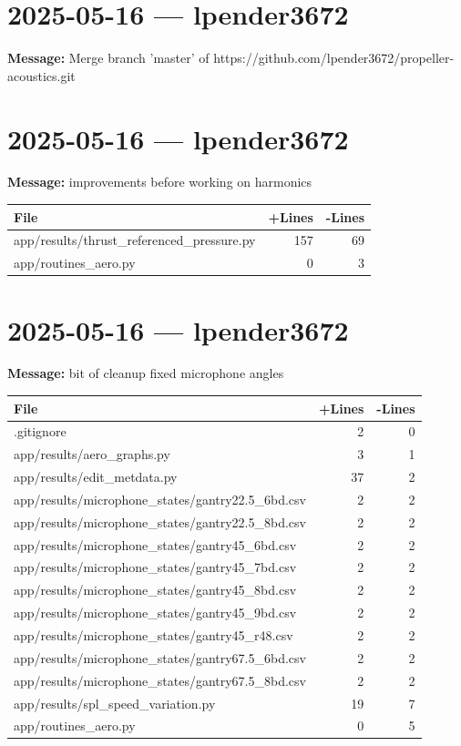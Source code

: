 \documentclass{article}
\begin{document}
\section*{2025-05-16 --- lpender3672}
\textbf{Message:} Merge branch 'master' of https://github.com/lpender3672/propeller-acoustics.git

\section*{2025-05-16 --- lpender3672}
\textbf{Message:} improvements before working on harmonics

\begin{longtable}{|p{10cm}|r|r|}
\hline \textbf{File} & \textbf{+Lines} & \textbf{-Lines} \\
\hline
app/results/thrust\_referenced\_pressure.py & 157 & 69 \\
\hline
app/routines\_aero.py & 0 & 3 \\
\hline
\end{longtable}

\section*{2025-05-16 --- lpender3672}
\textbf{Message:} bit of cleanup fixed microphone angles

\begin{longtable}{|p{10cm}|r|r|}
\hline \textbf{File} & \textbf{+Lines} & \textbf{-Lines} \\
\hline
.gitignore & 2 & 0 \\
\hline
app/results/aero\_graphs.py & 3 & 1 \\
\hline
app/results/edit\_metdata.py & 37 & 2 \\
\hline
app/results/microphone\_states/gantry22.5\_6bd.csv & 2 & 2 \\
\hline
app/results/microphone\_states/gantry22.5\_8bd.csv & 2 & 2 \\
\hline
app/results/microphone\_states/gantry45\_6bd.csv & 2 & 2 \\
\hline
app/results/microphone\_states/gantry45\_7bd.csv & 2 & 2 \\
\hline
app/results/microphone\_states/gantry45\_8bd.csv & 2 & 2 \\
\hline
app/results/microphone\_states/gantry45\_9bd.csv & 2 & 2 \\
\hline
app/results/microphone\_states/gantry45\_r48.csv & 2 & 2 \\
\hline
app/results/microphone\_states/gantry67.5\_6bd.csv & 2 & 2 \\
\hline
app/results/microphone\_states/gantry67.5\_8bd.csv & 2 & 2 \\
\hline
app/results/spl\_speed\_variation.py & 19 & 7 \\
\hline
app/routines\_aero.py & 0 & 5 \\
\hline
\end{longtable}
\end{document}
